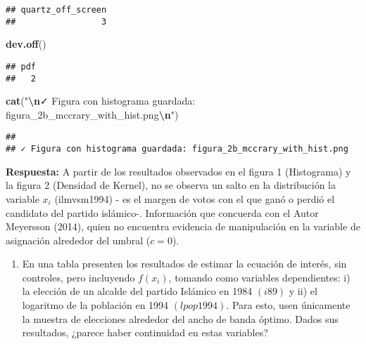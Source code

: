 \documentclass[
]{article}
\newenvironment{Shaded}{\begin{snugshade}}{\end{snugshade}}
\newcommand{\FunctionTok}[1]{\textcolor[rgb]{0.13,0.29,0.53}{\textbf{#1}}}
\newcommand{\NormalTok}[1]{#1}
\newcommand{\SpecialCharTok}[1]{\textcolor[rgb]{0.81,0.36,0.00}{\textbf{#1}}}
\newcommand{\StringTok}[1]{\textcolor[rgb]{0.31,0.60,0.02}{#1}}
\providecommand{\tightlist}{%
  \setlength{\itemsep}{0pt}\setlength{\parskip}{0pt}}
\begin{document}
\begin{verbatim}
## quartz_off_screen 
##                 3
\end{verbatim}

\begin{Shaded}
\begin{Highlighting}[]
\FunctionTok{dev.off}\NormalTok{()}
\end{Highlighting}
\end{Shaded}

\begin{verbatim}
## pdf 
##   2
\end{verbatim}

\begin{Shaded}
\begin{Highlighting}[]
\FunctionTok{cat}\NormalTok{(}\StringTok{"}\SpecialCharTok{\textbackslash{}n}\StringTok{✓ Figura con histograma guardada: figura\_2b\_mccrary\_with\_hist.png}\SpecialCharTok{\textbackslash{}n}\StringTok{"}\NormalTok{)}
\end{Highlighting}
\end{Shaded}

\begin{verbatim}
## 
## ✓ Figura con histograma guardada: figura_2b_mccrary_with_hist.png
\end{verbatim}

\textbf{Respuesta:} A partir de los resultados observados en el figura 1
(Histograma) y la figura 2 (Densidad de Kernel), no se observa un salto
en la distribución la variable \(x_i\) (ilmvsm1994) - es el margen de
votos con el que ganó o perdió el candidato del partido islámico-.
Información que concuerda con el Autor Meyersson (2014), quien no
encuentra evidencia de manipulación en la variable de asignación
alrededor del umbral (\(c=0\)).

\begin{enumerate}
\def\labelenumi{\alph{enumi})}
\setcounter{enumi}{1}
\tightlist
\item
  En una tabla presenten los resultados de estimar la ecuación de
  interés, sin controles, pero incluyendo \(f(x_i)\), tomando como
  variables dependientes: i) la elección de un alcalde del partido
  Islámico en 1984 \((i89)\) y ii) el logaritmo de la población en 1994
  \((lpop1994)\). Para esto, usen únicamente la muestra de elecciones
  alrededor del ancho de banda óptimo. Dados sus resultados, ¿parece
  haber continuidad en estas variables?
\end{enumerate}
\end{document}

